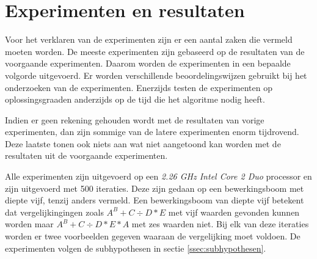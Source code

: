 \documentclass[Main.tex]{subfiles}
\begin{document}
\section{Experimenten en resultaten}
Voor het verklaren van de experimenten zijn er een aantal zaken die vermeld moeten worden. De meeste experimenten zijn gebaseerd op de resultaten van de voorgaande experimenten. Daarom worden de experimenten in een bepaalde volgorde uitgevoerd. Er worden verschillende beoordelingswijzen gebruikt bij het onderzoeken van de experimenten. Enerzijds testen de experimenten op oplossingsgraad\footnotemark[\ref{note:oplossingsgraad}] en anderzijds op de tijd die het algoritme nodig heeft. 
\par Indien er geen rekening gehouden wordt met de resultaten van vorige experimenten, dan zijn sommige van de latere experimenten enorm tijdrovend. Deze laatste tonen ook niets aan wat niet aangetoond kan worden met de resultaten uit de voorgaande experimenten. \par Alle experimenten zijn uitgevoerd op een \textit{2.26 GHz Intel Core 2 Duo} processor en zijn uitgevoerd met 500 iteraties. Deze zijn gedaan op een bewerkingsboom met diepte vijf, tenzij anders vermeld. Een bewerkingsboom van diepte vijf betekent dat vergelijkingingen zoals $A^{B}+C \div D \ast E$ met vijf waarden gevonden kunnen worden maar $A^{B}+C \div D \ast E \ast A$ met zes waarden niet. Bij elk van deze iteraties worden er twee voorbeelden gegeven waaraan de vergelijking moet voldoen. De experimenten volgen de subhypothesen in sectie \ref{ssec:subhypothesen}.  
\end{document}
